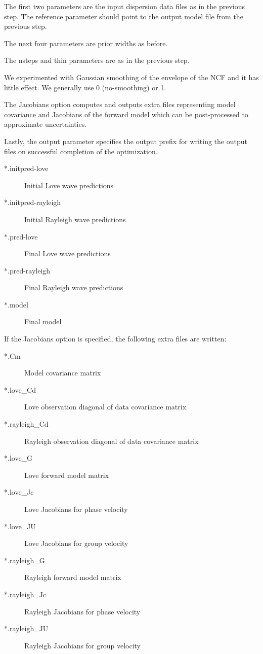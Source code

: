 \documentclass{article}
\begin{document}
The first two parameters are the input dispersion data files as in the
previous step. The reference parameter should point to the output
model file from the previous step.

The next four parameters are prior widths as before.

The nsteps and thin parameters are as in the previous step.

We experimented with Gaussian smoothing of the envelope of the NCF and it has little effect. We generally
use 0 (no-smoothing) or 1.

The Jacobians option computes and outputs extra files representing model covariance and Jacobians of the
forward model which can be post-processed to approximate uncertainties.

Lastly, the output parameter specifies the output prefix for writing the output files on successful
completion of the optimization.

\begin{description}
\item[*.initpred-love] Initial Love wave predictions
\item[*.initpred-rayleigh] Initial Rayleigh wave predictions
\item[*.pred-love] Final Love wave predictions
\item[*.pred-rayleigh] Final Rayleigh wave predictions
\item[*.model] Final model
\end{description}

If the Jacobians option is specified, the following extra files are written:

\begin{description}
\item[*.Cm] Model covariance matrix
\item[*.love\_Cd] Love observation diagonal of data covariance matrix
\item[*.rayleigh\_Cd] Rayleigh observation diagonal of data covariance matrix
\item[*.love\_G] Love forward model matrix
\item[*.love\_Jc] Love Jacobians for phase velocity
\item[*.love\_JU] Love Jacobians for group velocity
\item[*.rayleigh\_G]  Rayleigh forward model matrix
\item[*.rayleigh\_Jc] Rayleigh Jacobians for phase velocity
\item[*.rayleigh\_JU] Rayleigh Jacobians for group velocity
\end{description}  
\end{document}
